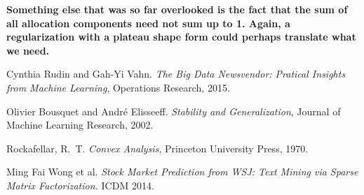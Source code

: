 \documentclass[11pt]{article}
\theoremstyle{plain}
\theoremstyle{definition}
\begin{document}
\textbf{Something else that was so far overlooked is the fact that the sum of all
  allocation components need not sum up to 1. Again, a regularization with a plateau shape
  form could perhaps translate what we need.}
 

\begin{thebibliography}{99}

  Cynthia Rudin and Gah-Yi Vahn. \textit{The Big Data Newsvendor: Pratical Insights from
    Machine Learning}, Operations Research, 2015.

  Olivier Bousquet and André Elisseeff. \textit{Stability and Generalization}, Journal of
  Machine Learning Research, 2002.

  Rockafellar, R.~T. \emph{Convex Analysis}, Princeton University Press, 1970.

 Ming Fai Wong et al. \emph{Stock Market Prediction from WSJ: Text Mining via
    Sparse Matrix Factorization.} ICDM 2014. 

\end{thebibliography}
\end{document}
